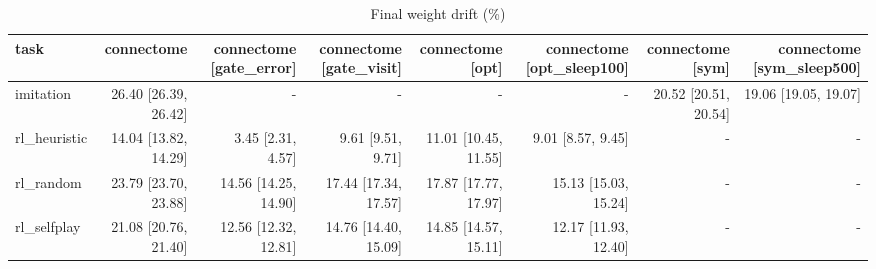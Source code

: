 \begin{table}[t]
\centering
\small
\begin{tabular}{lrrrrrrr}
\toprule
task & connectome & connectome [gate\_error] & connectome [gate\_visit] & connectome [opt] & connectome [opt\_sleep100] & connectome [sym] & connectome [sym\_sleep500] \\
\midrule
imitation & 26.40 [26.39, 26.42] & - & - & - & - & 20.52 [20.51, 20.54] & 19.06 [19.05, 19.07] \\
rl\_heuristic & 14.04 [13.82, 14.29] & 3.45 [2.31, 4.57] & 9.61 [9.51, 9.71] & 11.01 [10.45, 11.55] & 9.01 [8.57, 9.45] & - & - \\
rl\_random & 23.79 [23.70, 23.88] & 14.56 [14.25, 14.90] & 17.44 [17.34, 17.57] & 17.87 [17.77, 17.97] & 15.13 [15.03, 15.24] & - & - \\
rl\_selfplay & 21.08 [20.76, 21.40] & 12.56 [12.32, 12.81] & 14.76 [14.40, 15.09] & 14.85 [14.57, 15.11] & 12.17 [11.93, 12.40] & - & - \\
\bottomrule
\end{tabular}
\caption{Final weight drift (\%)}
\label{tab:tictactoe_drift}
\end{table}